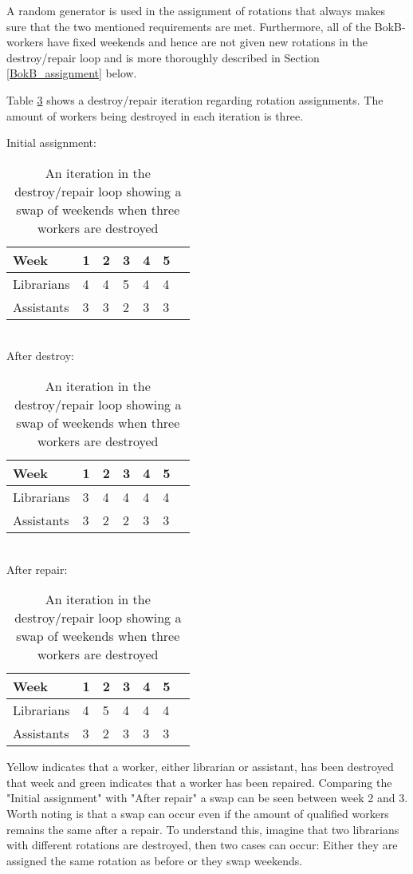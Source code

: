 A random generator is used in the assignment of rotations that always makes sure that the two mentioned requirements are met. Furthermore, all of the BokB-workers have fixed weekends and hence are not given new rotations in the destroy/repair loop and is more thoroughly described in Section \ref{BokB_assignment} below. 

Table \ref{rotation_assignment} shows a destroy/repair iteration regarding rotation assignments. The amount of workers being destroyed in each iteration is three.

\begin{table}[!h]
\centering
\caption{An iteration in the destroy/repair loop showing a swap of weekends when three workers are destroyed}
\label{rotation_assignment}
Initial assignment:\\
\begin{tabular}{l|llllll}
\rowcolor[HTML]{C0C0C0}
Week       & 1 & 2 & 3 & 4 & 5  \\ \hline
Librarians & 4 & 4 & 5 & 4 & 4  \\ \hline
Assistants & 3 & 3 & 2 & 3 & 3 
\end{tabular}\\
After destroy:\\
\begin{tabular}{l|llllll}
\rowcolor[HTML]{C0C0C0}
Week       & 1                         & 2                         & 3                         & 4                         & 5                          \\ \hline
Librarians & \cellcolor[HTML]{FFFE65}3 & 4 & \cellcolor[HTML]{FFFE65}4 & 4 & 4  \\ \hline
Assistants & 3 & \cellcolor[HTML]{FFFE65}2 & 2 & 3 & 3
\end{tabular}\\
After repair:\\
\begin{tabular}{l|llllll}
\rowcolor[HTML]{C0C0C0}
Week       & 1 & 2 & 3 & 4 & 5  \\ \hline
Librarians & \cellcolor[HTML]{9AFF99}4 & \cellcolor[HTML]{9AFF99}5 & 4 & 4 & 4  \\ \hline
Assistants & 3 & 2 & \cellcolor[HTML]{9AFF99}3 & 3 & 3 
\end{tabular}
\end{table}

Yellow indicates that a worker, either librarian or assistant, has been destroyed that week and green indicates that a worker has been repaired. Comparing the "Initial assignment" with "After repair" a swap can be seen between week 2 and 3. Worth noting is that a swap can occur even if the amount of qualified workers remains the same after a repair. To understand this, imagine that two librarians with different rotations are destroyed, then two cases can occur: Either they are assigned the same rotation as before or they swap weekends. 


